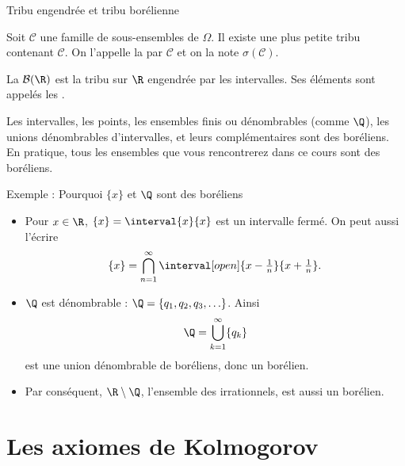 \documentclass[nuit,charter,pied]{BeamerJS}
\newcommand{\borel}{\mathcal{B}(\R)}
\begin{document}
\begin{frame}[t]{Tribu engendrée et tribu borélienne}
\pause
	\begin{prop}
		Soit \(\mathcal{C}\) une famille de sous-ensembles de \(\Omega\). Il existe une plus petite tribu contenant \(\mathcal{C}\). On l'appelle la  par \(\mathcal{C}\) et on la note \(\sigma(\mathcal{C})\).
	\end{prop}
	\pause
	\begin{defn}
		La  \(\borel\) est la tribu sur \(\R\) engendrée par les intervalles. Ses éléments sont appelés les .
	\end{defn}
	\pause
	\begin{lumiere}
		Les intervalles, les points, les ensembles finis ou dénombrables (comme \(\Q\)), les unions dénombrables d'intervalles, et leurs complémentaires sont des boréliens. En pratique, tous les ensembles que vous rencontrerez dans ce cours sont des boréliens.
	\end{lumiere}
\end{frame}

\begin{frame}{Exemple : Pourquoi \(\{x\}\) et \(\Q\) sont des boréliens}
	\pause
	\begin{itemize}
		\item Pour \(x\in\R\), \(\{x\}=\interval{x}{x}\) est un intervalle fermé. \pause On peut aussi l'écrire
		\[\{x\}=\bigcap_{n=1}^{\infty}\interval[open]{x-\tfrac{1}{n}}{x+\tfrac{1}{n}}.\]\pause
		\item \(\Q\) est dénombrable : \(\Q=\{q_1,q_2,q_3,\ldots\}\). \pause Ainsi
		\[\Q=\bigcup_{k=1}^{\infty}\{q_k\}\]
		est une union dénombrable de boréliens, donc un borélien.\pause
		\item Par conséquent, \(\R\setminus\Q\), l'ensemble des irrationnels, est aussi un borélien.
	\end{itemize}
\end{frame}

\section{Les axiomes de Kolmogorov}
\end{document}
